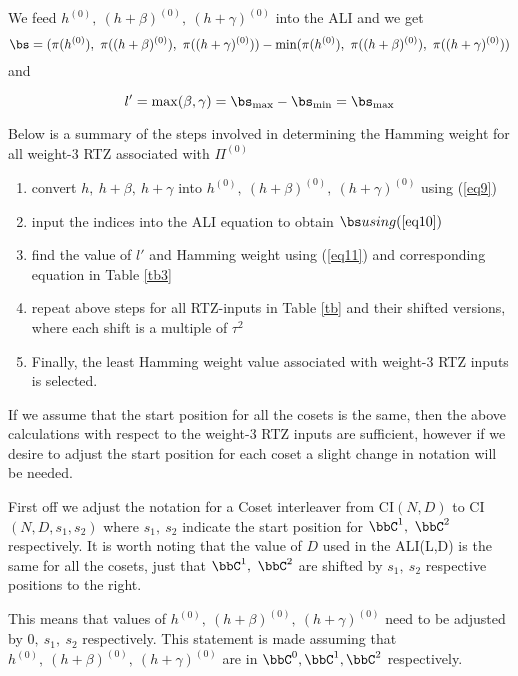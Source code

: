 \documentclass[11pt, oneside, dvipdfmx]{book}
\begin{document}
 We feed $h^{(0)},~(h+\beta)^{(0)},~(h+\gamma)^{(0)}$ into the ALI and we get \begin{equation}
 \bs=(\pi(h^{(0)}),~\pi((h+\beta)^{(0)}),~\pi((h+\gamma)^{(0)}))-\min(\pi(h^{(0)}),~\pi((h+\beta)^{(0)}),~\pi((h+\gamma)^{(0)}))
 \label{eq10}
 \end{equation}
  and 
 
 \begin{equation}
 l'=\max(\beta,\gamma)= \bs_{\max}-\bs_{\min}=\bs_{\max}
 \label{eq11}
 \end{equation}
 
 Below is a summary of the steps involved in determining the Hamming weight for all weight-$3$ RTZ associated with $\Pi^{(0)}$ 
 \begin{enumerate}
 \item convert  $h,~h+\beta,~h+\gamma$ into $h^{(0)},~(h+\beta)^{(0)},~(h+\gamma)^{(0)}$ using (\ref{eq9})
 
 \item input the indices into the ALI equation to obtain $\bs using (\ref{eq10})$
 
 \item find the value of $l'$ and  Hamming weight using (\ref{eq11}) and corresponding equation in Table \ref{tb3}
 
 \item repeat above steps for all RTZ-inputs in Table \ref{tb} and their shifted versions, where each shift is a multiple of $\tau^2$
 
\item Finally, the least Hamming weight value associated with weight-$3$ RTZ inputs is selected.
 \end{enumerate}
 
 If we assume that the start position for all the cosets is the same, then the above calculations with respect to the weight-$3$ RTZ inputs are sufficient, however if we desire to adjust the start position for each coset a slight change in notation will be needed. 
 
 First off we adjust the notation for a Coset interleaver from CI$(N,D)$ to CI$(N,D,s_1,s_2)$ where $s_1,~s_2$ indicate the start position for $\bbC^1,~\bbC^2$ respectively. It is worth noting that the value of $D$ used in the ALI(L,D) is the same for all the cosets, just that $\bbC^1,~\bbC^2$ are shifted by  $s_1,~s_2$ respective positions to the right.
 
 This means that values of $h^{(0)},~(h+\beta)^{(0)},~(h+\gamma)^{(0)}$ need to be adjusted by $0,~s_1,~s_2$ respectively. This statement is made assuming that $h^{(0)},~(h+\beta)^{(0)},~(h+\gamma)^{(0)}$ are in $\bbC^0,\bbC^1,\bbC^2$ respectively.
 
\end{document}
